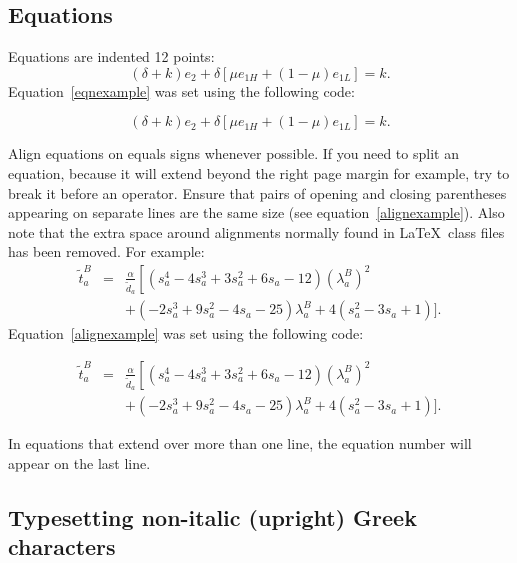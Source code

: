 \documentclass{cje}          %
\theoremstyle{plain}%
\theoremstyle{definition}
\theoremstyle{remark}
\begin{document}
\subsection{Equations}
Equations are indented 12 points:
\begin{equation}
\label{eqnexample}
  (\delta + k)e_2 + \delta 
  \left[\mu e_{1H} + (1-\mu)e_{1L}\right]=k.
\end{equation}
Equation~\eqref{eqnexample} was set using the following code:
\begin{smallverbatim}
\begin{equation}
\label{eqnexample}
  (\delta + k)e_2 + \delta 
  \left[\mu e_{1H} + (1-\mu)e_{1L}\right]=k.
\end{equation}
\end{smallverbatim}
Align equations on equals signs whenever possible. If you need to split an equation, because it will extend beyond the right page margin for example, try to break it before an operator. Ensure that pairs of opening and closing parentheses appearing on separate lines are the same size (see equation~\ref{alignexample}). Also note that the extra space around alignments normally found in \LaTeX\ class files has been removed. For example: 
\begin{eqnarray}
\label{alignexample}
\tilde t_a^B &=& \frac{\alpha}{\tilde d_a}\left[
  \left(s_a^4 - 4s_a^3 + 3s_a^2 + 6s_a - 12\right)
  \left(\lambda_a^B\right)^2 \right.\nonumber\\
    && + \left(-2s_a^3 + 9s_a^2 - 4s_a - 25\right)\lambda_a^B 
       + 4\left(s_a^2 - 3s_a + 1\right)\!\bigg].
\end{eqnarray}
Equation~\eqref{alignexample} was set using the following code:
\begin{smallverbatim}
\begin{eqnarray}
\label{alignexample}
\tilde t_a^B &=& \frac{\alpha}{\tilde d_a}\left[
  \left(s_a^4 - 4s_a^3 + 3s_a^2 + 6s_a - 12\right)
  \left(\lambda_a^B\right)^2 \right.\nonumber\\
    && + \left(-2s_a^3 + 9s_a^2 - 4s_a - 25\right)\lambda_a^B 
       + 4\left(s_a^2 - 3s_a + 1\right)\!\bigg].
\end{eqnarray}
\end{smallverbatim}
In equations that extend over more than one line, the equation number will appear on the last line.

\subsection{Typesetting non-italic (upright) Greek characters}
\label{Greekchar}
\end{document}

